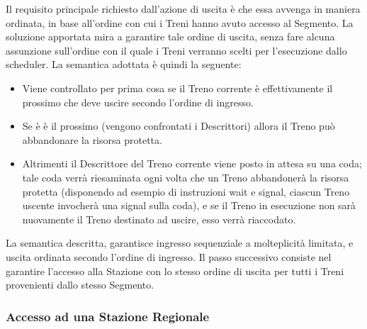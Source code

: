 \begin{description}
			Il requisito principale richiesto dall'azione di uscita è che essa avvenga in maniera ordinata, in base all'ordine con cui i Treni hanno avuto accesso al Segmento. La soluzione apportata mira a garantire tale ordine di uscita, senza fare alcuna assunzione sull'ordine con il quale i Treni verranno scelti per l'esecuzione dallo scheduler. La semantica adottata è quindi la seguente:
			\begin{itemize}
				 \item Viene controllato per prima cosa se il Treno corrente è effettivamente il prossimo che deve uscire secondo l'ordine di ingresso.
				 \item Se è è il prossimo (vengono confrontati i Descrittori) allora il Treno può abbandonare la risorsa protetta.
				 \item Altrimenti il Descrittore del Treno corrente viene posto in attesa su una coda; tale coda verrà riesaminata ogni volta che un Treno abbandonerà la risorsa protetta (disponendo ad esempio di instruzioni wait e signal, ciascun Treno uscente invocherà una signal sulla coda), e se il Treno in esecuzione non sarà nuovamente il Treno destinato ad uscire, esso verrà riaccodato. 
			\end{itemize}
		\end {description}  
	
	La semantica descritta, garantisce ingresso sequenziale a molteplicità limitata, e uscita ordinata secondo l'ordine di ingresso. Il passo successivo consiste nel garantire l'accesso alla Stazione con lo stesso ordine di uscita per tutti i Treni provenienti dallo stesso Segmento.


		\subsubsection{Accesso ad una Stazione Regionale}\label{subsubsec:regional_station_access}
		
